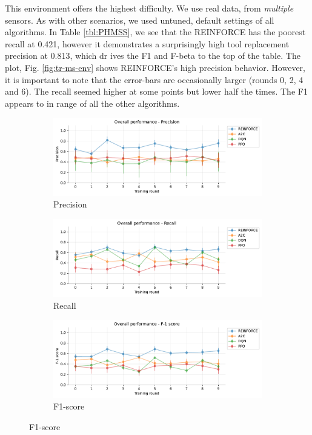 \documentclass[a4paper, 12pt]{article}
\begin{document}
This environment offers the highest difficulty. We use real data, from \textit{multiple} sensors. As with other scenarios, we used untuned, default settings of all algorithms. In Table \ref{tbl:PHMSS}, we see that the REINFORCE has the poorest recall at 0.421, however it demonstrates a surprisingly high tool replacement precision at 0.813, which dr ives the F1 and F-beta to the top of the table. The plot, Fig. \ref{fig:tr-ms-env} shows REINFORCE's high precision behavior. However, it is important to note that the error-bars are occasionally larger (rounds 0, 2, 4 and 6). The recall seemed higher at some points but lower half the times. The F1 appears to in range of all the other algorithms.

\begin{figure}[!htbp]
	\begin{subfigure}{\textwidth}
	\centering
	\includegraphics[width=\linewidth]{Overall_Pr.pdf}  
	\caption{Precision}
	\label{fig:tr-ovr-pr}
	\end{subfigure} \par\smallskip

	\begin{subfigure}{\textwidth}
	\centering
	\includegraphics[width=\linewidth]{Overall_Rc.pdf}  
	\caption{Recall}
	\label{fig:tr-ovr-rc}
	\end{subfigure} \par\smallskip
	
	\begin{subfigure}{\textwidth}
		\centering
		\includegraphics[width=\linewidth]{Overall_F1.pdf}  
		\caption{F1-score}
		\label{fig:tr-ovr-f1}
	\end{subfigure} \par\smallskip


\end{figure}
\end{document}
